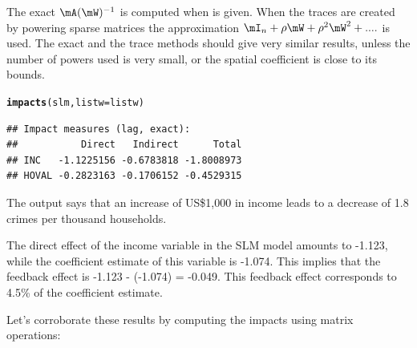 \documentclass[english,12pt]{book}\usepackage[]{graphicx}\usepackage[]{xcolor}
\makeatletter
\newcommand{\hlstd}[1]{\textcolor[rgb]{0.345,0.345,0.345}{#1}}%
\newcommand{\hlkwc}[1]{\textcolor[rgb]{0.333,0.667,0.333}{#1}}%
\newcommand{\hlkwd}[1]{\textcolor[rgb]{0.737,0.353,0.396}{\textbf{#1}}}%
\newenvironment{kframe}{%
 \def\at@end@of@kframe{}%
 \ifinner\ifhmode%
  \def\at@end@of@kframe{\end{minipage}}%
  \begin{minipage}{\columnwidth}%
 \fi\fi%
 \def\FrameCommand##1{\hskip\@totalleftmargin \hskip-\fboxsep
 \colorbox{shadecolor}{##1}\hskip-\fboxsep
     \hskip-\linewidth \hskip-\@totalleftmargin \hskip\columnwidth}%
 \MakeFramed {\advance\hsize-\width
   \@totalleftmargin\z@ \linewidth\hsize
   \@setminipage}}%
 {\par\unskip\endMakeFramed%
 \at@end@of@kframe}
\newenvironment{knitrout}{}{} %
\makeatother
\begin{document}
The exact $\mA(\mW)^{-1}$ is computed when  is given. When the traces are created by powering sparse matrices the approximation $\mI_n + \rho\mW + \rho^2\mW^2 +....$ is used. The exact and the trace methods should give very similar results, unless the number of powers used is very small, or the spatial coefficient is close to its bounds. 

\begin{knitrout}
\color{fgcolor}\begin{kframe}
\begin{alltt}
\hlkwd{impacts}\hlstd{(slm,} \hlkwc{listw} \hlstd{= listw)}
\end{alltt}
\begin{verbatim}
## Impact measures (lag, exact):
##           Direct   Indirect      Total
## INC   -1.1225156 -0.6783818 -1.8008973
## HOVAL -0.2823163 -0.1706152 -0.4529315
\end{verbatim}
\end{kframe}
\end{knitrout}

The output says that an increase of US\$1,000 in income leads to a decrease of 1.8 crimes per thousand households. 

The direct effect of the income variable in the SLM model amounts to -1.123, while the coefficient estimate of this variable is -1.074. This implies that the feedback effect is -1.123 - (-1.074) = -0.049. This feedback effect corresponds to 4.5\% of the coefficient estimate. 

Let's corroborate these results by computing the impacts using matrix operations:
\end{document}
